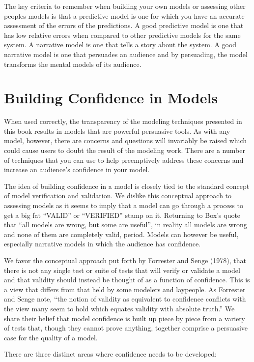 \documentclass[]{memoir}
\begin{document}
The key criteria to remember when building your own models or assessing
other peoples models is that a predictive model is one for which you
have an accurate assessment of the errors of the predictions. A good
predictive model is one that has low relative errors when compared to
other predictive models for the same system. A narrative model is one
that tells a story about the system. A good narrative model is one that
persuades an audience and by persuading, the model transforms the mental
models of its audience.

\chapter{Building Confidence in Models}

When used correctly, the transparency of the modeling techniques
presented in this book results in models that are powerful persuasive
tools. As with any model, however, there are concerns and questions will
invariably be raised which could cause users to doubt the result of the
modeling work. There are a number of techniques that you can use to help
preemptively address these concerns and increase an audience's
confidence in your model.

The idea of building confidence in a model is closely tied to the
standard concept of model verification and validation. We dislike this
conceptual approach to assessing models as it seems to imply that a
model can go through a process to get a big fat ``VALID'' or
``VERIFIED'' stamp on it. Returning to Box's quote that ``all models are
wrong, but some are useful'', in reality all models are wrong and none
of them are completely valid, period. Models can however be useful,
especially narrative models in which the audience has confidence.

We favor the conceptual approach put forth by Forrester and Senge
(1978), that there is not any single test or suite of tests that will
verify or validate a model and that validity should instead be thought
of as a function of confidence. This is a view that differs from that
held by some modelers and laypeople. As Forrester and Senge note, ``the
notion of validity as equivalent to confidence conflicts with the view
many seem to hold which equates validity with absolute truth.'' We share
their belief that model confidence is built up piece by piece from a
variety of tests that, though they cannot prove anything, together
comprise a persuasive case for the quality of a model.

There are three distinct areas where confidence needs to be developed:
\end{document}
